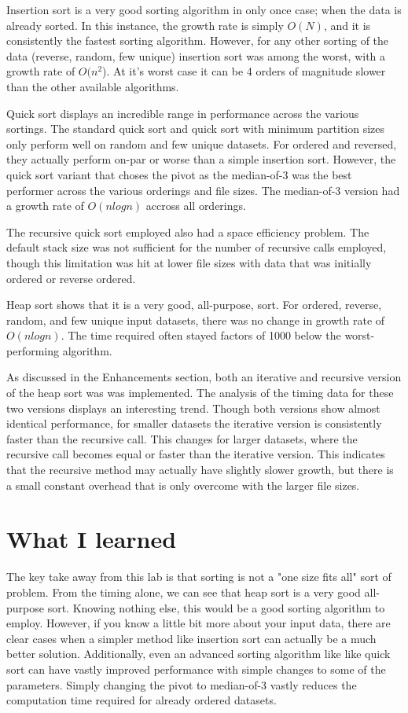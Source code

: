 \documentclass[a4paper,12pt]{article}
\begin{document}
Insertion sort is a very good sorting algorithm in only once case; when the data is already sorted.  In this instance, the growth rate is simply $O(N)$, and it is consistently the fastest sorting algorithm.  However, for any other sorting of the data (reverse, random, few unique) insertion sort was among the worst, with a growth rate of $O(n^2$).  At it's worst case it can be 4 orders of magnitude slower than the other available algorithms.

Quick sort displays an incredible range in performance across the various sortings.  The standard quick sort and quick sort with minimum partition sizes only perform well on random and few unique datasets.  For ordered and reversed, they actually perform on-par or worse than a simple insertion sort.  However, the quick sort variant that choses the pivot as the median-of-3 was the best performer across the various orderings and file sizes.  The median-of-3 version had a growth rate of $O(nlogn)$ accross all orderings.

The recursive quick sort employed also had a space efficiency problem.  The default stack size was not sufficient for the number of recursive calls employed, though this limitation was hit at lower file sizes with data that was initially ordered or reverse ordered.

Heap sort shows that it is a very good, all-purpose, sort.  For ordered, reverse, random, and few unique input datasets, there was no change in growth rate of $O(nlogn)$.  The time required often stayed factors of 1000 below the worst-performing algorithm. 

As discussed in the Enhancements section, both an iterative and recursive version of the heap sort was was implemented.  The analysis of the timing data for these two versions displays an interesting trend.  Though both versions show almost identical performance, for smaller datasets the iterative version is consistently faster than the recursive call.  This changes for larger datasets, where the recursive call becomes equal or faster than the iterative version.  This indicates that the recursive method may actually have slightly slower growth, but there is a small constant overhead that is only overcome with the larger file sizes.



\section{What I learned}
The key take away from this lab is that sorting is not a "one size fits all" sort of problem.  From the timing alone, we can see that heap sort is a very good all-purpose sort.  Knowing nothing else, this would be a good sorting algorithm to employ.  However, if you know a little bit more about your input data, there are clear cases when a simpler method like insertion sort can actually be a much better solution.  Additionally, even an advanced sorting algorithm like like quick sort can have vastly improved performance with simple changes to some of the parameters.  Simply changing the pivot to median-of-3 vastly reduces the computation time required for already ordered datasets.
\end{document}
